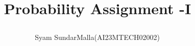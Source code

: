 \documentclass[journal,12pt,twocolumn]{IEEEtran}
\DeclareMathOperator*{\Res}{Res}
\begin{document}
%


\newtheorem{theorem}{Theorem}[section]
\newtheorem{problem}{Problem}
\newtheorem{proposition}{Proposition}[section]
\newtheorem{lemma}{Lemma}[section]
\newtheorem{corollary}[theorem]{Corollary}
\newtheorem{example}{Example}[section]
\newtheorem{definition}[problem]{Definition}

\newcommand{\BEQA}{\begin{eqnarray}}
\newcommand{\EEQA}{\end{eqnarray}}
\newcommand{\define}{\stackrel{\triangle}{=}}


\providecommand{\mbf}{\mathbf}
\providecommand{\pr}[1]{\ensuremath{\Pr\left(#1\right)}}
\providecommand{\qfunc}[1]{\ensuremath{Q\left(#1\right)}}
\providecommand{\sbrak}[1]{\ensuremath{{}\left[#1\right]}}
\providecommand{\lsbrak}[1]{\ensuremath{{}\left[#1\right.}}
\providecommand{\rsbrak}[1]{\ensuremath{{}\left.#1\right]}}
\providecommand{\brak}[1]{\ensuremath{\left(#1\right)}}
\providecommand{\lbrak}[1]{\ensuremath{\left(#1\right.}}
\providecommand{\rbrak}[1]{\ensuremath{\left.#1\right)}}
\providecommand{\cbrak}[1]{\ensuremath{\left\{#1\right\}}}
\providecommand{\lcbrak}[1]{\ensuremath{\left\{#1\right.}}
\providecommand{\rcbrak}[1]{\ensuremath{\left.#1\right\}}}
\theoremstyle{remark}
\newtheorem{rem}{Remark}
\newcommand{\sgn}{\mathop{\mathrm{sgn}}}
\providecommand{\abs}[1]{\left\vert#1\right\vert}
\providecommand{\res}[1]{\Res\displaylimits_{#1}} 
\providecommand{\norm}[1]{\left\lVert#1\right\rVert}

\providecommand{\mtx}[1]{\mathbf{#1}}
\providecommand{\mean}[1]{E\left[ #1 \right]}
\providecommand{\fourier}{\overset{\mathcal{F}}{ \rightleftharpoons}}

\providecommand{\system}{\overset{\mathcal{H}}{ \longleftrightarrow}}
	
\newcommand{\solution}{\noindent \textbf{Solution: }}
\newcommand{\cosec}{\,\text{cosec}\,}
\providecommand{\dec}[2]{\ensuremath{\overset{#1}{\underset{#2}{\gtrless}}}}
\newcommand{\myvec}[1]{\ensuremath{\begin{pmatrix}#1\end{pmatrix}}}
\newcommand{\mydet}[1]{\ensuremath{\begin{vmatrix}#1\end{vmatrix}}}

\let\vec\mathbf

\vspace{3cm}
\title{

Probability Assignment -I

}
\author{ Syam SundarMalla(AI23MTECH02002)$^{}$
}	
\end{document}
